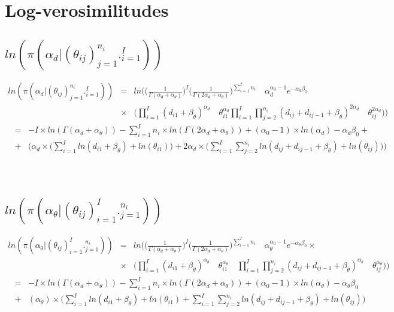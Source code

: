 \documentclass[10pt]{report}
\theoremstyle{plain}
\begin{document}
\chapter{Log-verosimilitudes}
\section{$ln(\pi(\alpha_d|(\theta_{ij})_{j=1}^{n_i}._{i=1}^I))$}
\begin{eqnarray*}
ln(\pi(\alpha_d|(\theta_{ij})_{j=1}^{n_i}._{i=1}^I)) &=& ln\Bigg(\Big(\frac{1}{\Gamma(\alpha_d+\alpha_\theta)}\Big)^I \Big(\frac{1}{\Gamma(2\alpha_d+\alpha_\theta)}\Big)^{\sum_{i=1}^I n_i} \quad \alpha_d^{\alpha_0-1} e^{-\alpha_d\beta_0} \\
&\times& \Bigg(\prod_{i=1}^I (d_{i1}+\beta_\theta)^{\alpha_d} \quad \theta_{i1}^{\alpha_d} \prod_{i=1}^I \prod_{j=2}^{n_i} (d_{ij}+d_{ij-1}+\beta_\theta)^{2\alpha_d}\quad \theta_{ij}^{2\alpha_d}\Bigg)\Bigg)
\end{eqnarray*}
\begin{eqnarray*}
&=& -I\times ln(\Gamma(\alpha_d+\alpha_\theta))-\sum_{i=1}^I n_i\times ln(\Gamma(2\alpha_d+\alpha_\theta))+(\alpha_0-1)\times ln(\alpha_d)-\alpha_d\beta_0 +\\
&+&\Bigg(\alpha_d \times \bigg(\sum_{i=1}^I ln(d_{i1}+\beta_\theta)+ ln(\theta_{i1})\bigg)+ 2\alpha_d\times \bigg(\sum_{i=1}^I \sum_{j=2}^{n_i}  ln(d_{ij}+d_{ij-1}+\beta_\theta)+ln(\theta_{ij})\bigg)\Bigg)
\end{eqnarray*}
\\
\\
\section{$ln(\pi(\alpha_\theta|(\theta_{ij})_{i=1}^I._{j=1}^{n_i}))$}
\begin{eqnarray*}
ln(\pi(\alpha_\theta|(\theta_{ij})_{i=1}^I._{j=1}^{n_i})) &=&ln\Bigg(\Big(\frac{1}{\Gamma(\alpha_d+\alpha_\theta)}\Big)^I \Big(\frac{1}{\Gamma(2\alpha_d+\alpha_\theta)}\Big)^{\sum_{i=1}^I n_i} \quad \alpha_\theta^{\alpha_0-1} e^{-\alpha_\theta\beta_0} \times \\
&\times& \Bigg(\prod_{i=1}^I (d_{i1}+\beta_\theta)^{\alpha_\theta} \quad \theta_{i1}^{\alpha_\theta}\quad \prod_{i=1}^I \prod_{j=2}^{n_i} (d_{ij}+d_{ij-1}+\beta_\theta)^{\alpha_\theta} \quad \theta_{ij}^{\alpha_\theta}\Bigg)\Bigg)
\end{eqnarray*}
\begin{eqnarray*}
&=& -I\times ln(\Gamma(\alpha_d+\alpha_\theta))-\sum_{i=1}^I n_i\times ln(\Gamma(2\alpha_d+\alpha_\theta))+(\alpha_0-1)\times ln(\alpha_\theta)-\alpha_\theta\beta_0 \\
&+&(\alpha_\theta)\times\Bigg(\sum_{i=1}^I ln(d_{i1}+\beta_\theta)+ ln(\theta_{i1})+ \sum_{i=1}^I \sum_{j=2}^{n_i} ln(d_{ij}+d_{ij-1}+\beta_\theta)+ ln(\theta_{ij})\Bigg)
\end{eqnarray*}
\\
\\
\\
\end{document}
